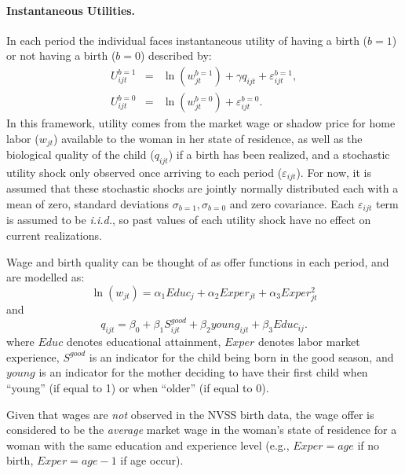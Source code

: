\documentclass[a4paper, 12 pt]{article}
\theoremstyle{plain}
\begin{document}
\begin{doublespace}
\paragraph{Instantaneous Utilities.}
In each period the individual faces instantaneous utility of having a birth
($b=1$) or not having a birth ($b=0$) described by:
\begin{eqnarray}
U_{ijt}^{b=1}&=&\ln(w_{jt}^{b=1}) + \gamma q_{ijt} + \varepsilon^{b=1}_{ijt}, \nonumber \\
U_{ijt}^{b=0}&=&\ln(w_{jt}^{b=0}) + \varepsilon^{b=0}_{ijt}. \nonumber
\end{eqnarray}
In this framework, utility comes from the market wage or shadow price for
home labor ($w_{jt}$) available to the woman in her state of residence, as well
as the biological quality of the child ($q_{ijt}$) if a birth has been realized,
and a stochastic utility shock only observed once arriving to each period
($\varepsilon_{ijt}$).  For now, it is assumed that these stochastic shocks are
jointly normally distributed each with a mean of zero, standard deviations
$\sigma_{b=1},\sigma_{b=0}$ and zero covariance.  Each $\varepsilon_{ijt}$ term
is assumed to be \emph{i.i.d.}, so past values of each utility shock have no effect on
current realizations.

Wage and birth quality can be thought of as offer functions in each period, and
are modelled as:
\[
\ln(w_{jt})=\alpha_1 Educ_{j} + \alpha_2 Exper_{jt} + \alpha_3 Exper_{jt}^2
\]
and
\[
q_{ijt} = \beta_0 + \beta_1 S^{good}_{ijt} + \beta_2 young_{ijt} + \beta_3 Educ_{ij}.
\]
where $Educ$ denotes educational attainment, $Exper$ denotes labor market experience, $S^{good}$ is an indicator for the child being born in the good season, and $young$ is an indicator for the mother deciding to have their first child when ``young'' (if equal to 1) or when ``older'' (if equal to 0).

Given that wages are \emph{not} observed in the NVSS birth data, the wage offer is
considered to be the \emph{average} market wage in the woman's state of residence for
a woman with the same education and experience level (e.g., $Exper=age$ if no birth, $Exper=age-1$ if age occur).


\end{doublespace}
\end{document}
